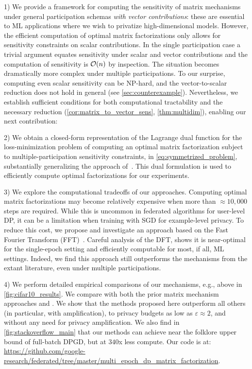 \documentclass{article} %
\theoremstyle{named}
\begin{document}
1) We provide a framework for computing the sensitivity of matrix mechanisms under general participation schemas \emph{with vector contributions}: these are essential to ML applications where we wish to privatize high-dimensional models. However, the efficient computation of optimal matrix factorizations only allows for sensitivity constraints on scalar contributions. In the single participation case a trivial argument equates sensitivity under scalar and vector contributions and the computation of sensitivity is $\mathcal{O}(n)$ by inspection. The situation becomes dramatically more complex under multiple participations. To our surprise, computing even scalar sensitivity can be NP-hard, and the vector-to-scalar reduction does not hold in general (see \cref{sec:counterexample}). Nevertheless, we establish sufficient conditions for both computational tractability and the necessary reduction (\cref{cor:matrix_to_vector_sens}, \cref{thm:multidim}), enabling our next contribution:

2) We obtain a closed-form representation of the Lagrange dual function for the loss-minimization problem of computing an optimal matrix factorization subject to multiple-participation sensitivity constraints, in \cref{eq:symmetrized_problem}, substantially generalizing the approach of~\citet{denisov22matfact}. This dual formulation is used to efficiently compute optimal factorizations for our experiments.

3) %
We explore the computational tradeoffs of our approaches. Computing optimal matrix factorizations may become relatively expensive when more than $\approx10,000$ steps are required. While this is uncommon in federated algorithms for user-level DP, it can be a limitation when training with SGD for example-level privacy. To reduce this cost, we propose and investigate an approach based on the Fast Fourier Transform (FFT)~\citep{cooley1965algorithm}. Careful analysis of the DFT, shows it is near-optimal for the single-epoch setting and efficiently computable for most, if all, ML settings. Indeed, we find this approach still outperforms the mechanisms from the extant literature, even under multiple participations.
    
4) We perform detailed empirical comparisons of our mechanisms, e.g., above in \cref{fig:cifar10_results}. We compare with both the prior matrix mechanism approaches and \DPSGD. We show that the methods proposed here outperform all others (in particular, \DPSGD with amplification), to privacy budgets as low as $\varepsilon\approx2$, and without any need for privacy amplification. We also find in  \cref{fig:stackoverflow_main} that our methods can achieve near the folklore upper bound of full-batch DPGD, but at $340$x less compute. Our code is at: \url{https://github.com/google-research/federated/tree/master/multi_epoch_dp_matrix_factorization}.
\end{document}
